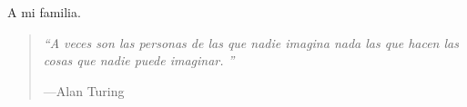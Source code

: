 \begin{dedication}

A mi familia.

\begin{quote}\it
	\textquotedblleft A veces son las personas de las que nadie imagina nada las que hacen las cosas que nadie puede imaginar. \textquotedblright

	\hspace{1em plus 1fill}---Alan Turing
\end{quote}

\end{dedication}